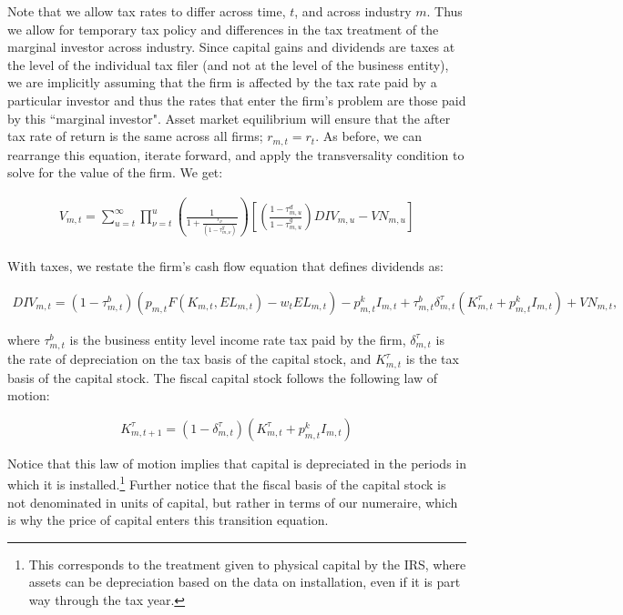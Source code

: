 \documentclass[letterpaper,12pt]{article}
\theoremstyle{definition}
\begin{document}
\begin{spacing}{1.5}
Note that we allow tax rates to differ across time, $t$, and across industry $m$. Thus we allow for temporary tax policy and differences in the tax treatment of the marginal investor across industry.  Since capital gains and dividends are taxes at the level of the individual tax filer (and not at the level of the business entity), we are implicitly assuming that the firm is affected by the tax rate paid by a particular investor and thus the rates that enter the firm's problem are those paid by this ``marginal investor".  Asset market equilibrium will ensure that the after tax rate of return is the same across all firms; $r_{m,t}=r_{t}$. As before, we can rearrange this equation, iterate forward, and apply the transversality condition to solve for the value of the firm.  We get:

\begin{equation}
\label{eqn:v_firm_tax2}
\begin{split}
 V_{m,t}= \sum_{u=t}^{\infty} \prod_{\nu=t}^{u}\left(\frac{1}{1+\frac{r_{\nu}}{(1-\tau^{g}_{m,\nu})}}\right)\left[ \left(\frac{1-\tau^{d}_{m,u}}{1-\tau^{g}_{m,u}}\right)DIV_{m,u}-VN_{m,u} \right] \\
\end{split}
\end{equation}

With taxes, we restate the firm's cash flow equation that defines dividends as: 

\begin{equation}
\label{eqn:div_tax}
\begin{split}
 DIV_{m,t}= (1-\tau^{b}_{m,t})\left(p_{m,t}F(K_{m,t},EL_{m,t})-w_{t}EL_{m,t}\right) - p^{k}_{m,t}I_{m,t} + \tau^{b}_{m,t}\delta^{\tau}_{m,t}(K^{\tau}_{m,t}+ p^{k}_{m,t}I_{m,t})+ VN_{m,t},
 \end{split}
\end{equation}

\noindent\noindent where $\tau^{b}_{m,t}$ is the business entity level income rate tax paid by the firm, $\delta^{\tau}_{m,t}$ is the rate of depreciation on the tax basis of the capital stock, and $K^{\tau}_{m,t}$ is the tax basis of the capital stock.  The fiscal capital stock follows the following law of motion:

\begin{equation}
\label{eqn:tax_cap_lom}
K^{\tau}_{m,t+1} = (1-\delta^{\tau}_{m,t})(K^{\tau}_{m,t} + p^{k}_{m,t}I_{m,t})
\end{equation}

\noindent\noindent Notice that this law of motion implies that capital is depreciated in the periods in which it is installed.\footnote{This corresponds to the treatment given to physical capital by the IRS, where assets can be depreciation based on the data on installation, even if it is part way through the tax year.}  Further notice that the fiscal basis of the capital stock is not denominated in units of capital, but rather in terms of our numeraire, which is why the price of capital enters this transition equation.


\end{spacing}
\end{document}
